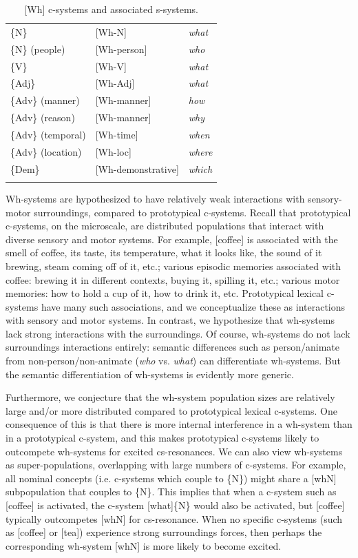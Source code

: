 \begin{table}
\begin{tabularx}{\textwidth}{XXX}
\lsptoprule
\{N\} & [Wh-N] & \textit{what}\\
\{N\} (people) & [Wh-person] & \textit{who}\\
\{V\} & [Wh-V] & \textit{what}\\
\{Adj\} & [Wh-Adj] & \textit{what}\\
\{Adv\} (manner) & [Wh-manner] & \textit{how}\\
\{Adv\} (reason) & [Wh-manner] & \textit{why}\\
\{Adv\} (temporal) & [Wh-time] & \textit{when}\\
\{Adv\} (location) & [Wh-loc] & \textit{where}\\
\{Dem\} & [Wh-demonstrative] & \textit{which}\\
\lspbottomrule
\end{tabularx}
\caption{[Wh] c-systems and associated s-systems.}\label{tab:7:4}
\end{table}
  Wh-systems are hypothesized to have relatively weak interactions with sensory-motor surroundings, compared to prototypical c-systems. Recall that prototypical c-systems, on the microscale, are distributed populations that interact with diverse sensory and motor systems. For example, [coffee] is associated with the smell of coffee, its taste, its temperature, what it looks like, the sound of it brewing, steam coming off of it, etc.; various episodic memories associated with coffee: brewing it in different contexts, buying it, spilling it, etc.; various motor memories: how to hold a cup of it, how to drink it, etc. Prototypical lexical c-systems have many such associations, and we conceptualize these as interactions with sensory and motor systems. In contrast, we hypothesize that wh-systems lack strong interactions with the surroundings. Of course, wh-systems do not lack surroundings interactions entirely: semantic differences such as person/animate from non-person/non-animate (\textit{who} vs. \textit{what}) can differentiate wh-systems. But the semantic differentiation of wh-systems is evidently more generic.

  Furthermore, we conjecture that the wh-system population sizes are relatively large and/or more distributed compared to prototypical lexical c-systems. One consequence of this is that there is more internal interference in a wh-system than in a prototypical c-system, and this makes prototypical c-systems likely to outcompete wh-systems for excited cs-resonances. We can also view wh-systems as super-populations, overlapping with large numbers of c-systems. For example, all nominal concepts (i.e. c-systems which couple to \{N\}) might share a [whN] subpopulation that couples to \{N\}. This implies that when a c-system such as [coffee] is activated, the c-system [what]\{N\} would also be activated, but [coffee] typically outcompetes [whN] for cs-resonance. When no specific c-systems (such as [coffee] or [tea]) experience strong surroundings forces, then perhaps the corresponding wh-system [whN] is more likely to become excited.

